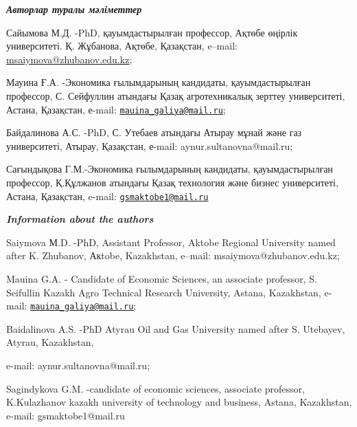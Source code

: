 \begin{authorinfo}

  \hspace{1em}\emph{{\bfseries Авторлар туралы мәліметтер}}

Сайымова М.Д. -PhD, қауымдастырылған профессор, Ақтөбе өңірлік
университеті. Қ. Жұбанова, Ақтөбе, Қазақстан, e--mail:
\href{mailto:77mika-07@mail.ru}{msaiymova@zhubanov.edu.kz};

Мауина Ғ.А. -Экономика ғылымдарының кандидаты, қауымдастырылған
профессор, С. Сейфуллин атындағы Қазақ агротехникалық зерттеу университеті, Астана, Қазақстан, е-mail:
\href{mailto:mauina_galiya@mail.ru}{\nolinkurl{mauina\_galiya@mail.ru}};

Байдалинова А.С. -PhD, С. Утебаев атындағы Атырау мұнай және газ
университеті, Атырау, Қазақстан, е-mail: aynur.sultanovna@mail.ru;

Сағындықова Г.М.-Экономика ғылымдарының кандидаты, қауымдастырылған
профессор, Қ.Құлжанов атындағы Қазақ технология және бизнес
университеті, Астана, Қазақстан, e-mail:
\href{mailto:gsmaktobe1@mail.ru}{\nolinkurl{gsmaktobe1@mail.ru}}

\hspace{1em}\emph{{\bfseries Information about the authors}}

Saiymova М.D. -PhD, Assistant Professor, Aktobe Regional University
named after K. Zhubanov, Акtobe, Kazakhstan, e--mail:
msaiymova@zhubanov.edu.kz;

Mauina G.A. - Candidate of Economic Sciences, an associate professor, S.
Seifullin Kazakh Agro Technical Research University, Astana, Kazakhstan,
e-mail:
\href{mailto:mauina_galiya@mail.ru}{\nolinkurl{mauina\_galiya@mail.ru}};

Baidalinova A.S. -PhD Atyrau Oil and Gas University named after S.
Utebayev, Atyrau, Kazakhstan,

e-mail: aynur.sultanovna@mail.ru;

Sagindykova G.M. -candidate of economic sciences, associate professor,
K.Kulazhanov kazakh university of technology and business, Astana,
Kazakhstan, e-mail: gsmaktobe1@mail.ru

\end{authorinfo}
